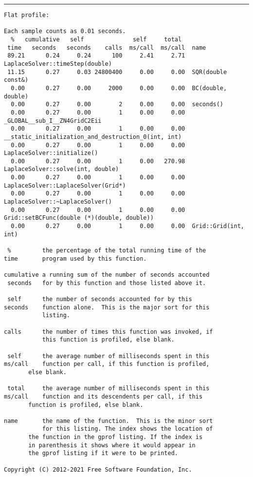 \documentclass[a4paper,twosidep]{article}
\begin{document}
\noindent\rule{\textwidth}{0.5pt}
\begin{verbatim}
Flat profile:

Each sample counts as 0.01 seconds.
  %   cumulative   self              self     total
 time   seconds   seconds    calls  ms/call  ms/call  name
 89.21      0.24     0.24      100     2.41     2.71  LaplaceSolver::timeStep(double)
 11.15      0.27     0.03 24800400     0.00     0.00  SQR(double const&)
  0.00      0.27     0.00     2000     0.00     0.00  BC(double, double)
  0.00      0.27     0.00        2     0.00     0.00  seconds()
  0.00      0.27     0.00        1     0.00     0.00  _GLOBAL__sub_I__ZN4GridC2Eii
  0.00      0.27     0.00        1     0.00     0.00  __static_initialization_and_destruction_0(int, int)
  0.00      0.27     0.00        1     0.00     0.00  LaplaceSolver::initialize()
  0.00      0.27     0.00        1     0.00   270.98  LaplaceSolver::solve(int, double)
  0.00      0.27     0.00        1     0.00     0.00  LaplaceSolver::LaplaceSolver(Grid*)
  0.00      0.27     0.00        1     0.00     0.00  LaplaceSolver::~LaplaceSolver()
  0.00      0.27     0.00        1     0.00     0.00  Grid::setBCFunc(double (*)(double, double))
  0.00      0.27     0.00        1     0.00     0.00  Grid::Grid(int, int)

 %         the percentage of the total running time of the
time       program used by this function.

cumulative a running sum of the number of seconds accounted
 seconds   for by this function and those listed above it.

 self      the number of seconds accounted for by this
seconds    function alone.  This is the major sort for this
           listing.

calls      the number of times this function was invoked, if
           this function is profiled, else blank.

 self      the average number of milliseconds spent in this
ms/call    function per call, if this function is profiled,
	   else blank.

 total     the average number of milliseconds spent in this
ms/call    function and its descendents per call, if this
	   function is profiled, else blank.

name       the name of the function.  This is the minor sort
           for this listing. The index shows the location of
	   the function in the gprof listing. If the index is
	   in parenthesis it shows where it would appear in
	   the gprof listing if it were to be printed.

Copyright (C) 2012-2021 Free Software Foundation, Inc.


\end{verbatim}
\end{document}
